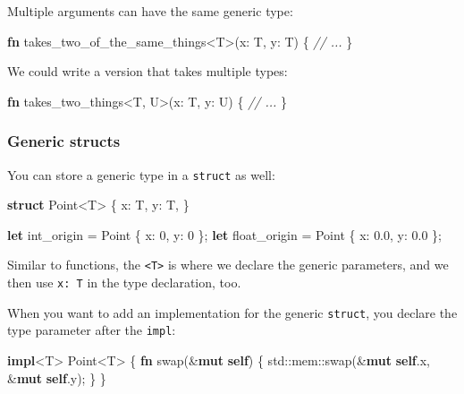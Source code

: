 \documentclass[a4paper,]{book}
\newenvironment{Shaded}{\begin{snugshade}}{\end{snugshade}}
\newcommand{\KeywordTok}[1]{\textcolor[rgb]{0.13,0.29,0.53}{\textbf{{#1}}}}
\newcommand{\DecValTok}[1]{\textcolor[rgb]{0.00,0.00,0.81}{{#1}}}
\newcommand{\CommentTok}[1]{\textcolor[rgb]{0.56,0.35,0.01}{\textit{{#1}}}}
\newcommand{\NormalTok}[1]{{#1}}
\begin{document}
Multiple arguments can have the same generic type:

\begin{Shaded}
\begin{Highlighting}[]
\KeywordTok{fn} \NormalTok{takes_two_of_the_same_things<T>(x: T, y: T) \{}
    \CommentTok{// ...}
\NormalTok{\}}
\end{Highlighting}
\end{Shaded}

We could write a version that takes multiple types:

\begin{Shaded}
\begin{Highlighting}[]
\KeywordTok{fn} \NormalTok{takes_two_things<T, U>(x: T, y: U) \{}
    \CommentTok{// ...}
\NormalTok{\}}
\end{Highlighting}
\end{Shaded}

\subsubsection{Generic structs}\label{generic-structs}

You can store a generic type in a \texttt{struct} as well:

\begin{Shaded}
\begin{Highlighting}[]
\KeywordTok{struct} \NormalTok{Point<T> \{}
    \NormalTok{x: T,}
    \NormalTok{y: T,}
\NormalTok{\}}

\KeywordTok{let} \NormalTok{int_origin = Point \{ x: }\DecValTok{0}\NormalTok{, y: }\DecValTok{0} \NormalTok{\};}
\KeywordTok{let} \NormalTok{float_origin = Point \{ x: }\DecValTok{0.0}\NormalTok{, y: }\DecValTok{0.0} \NormalTok{\};}
\end{Highlighting}
\end{Shaded}

Similar to functions, the \texttt{\textless{}T\textgreater{}} is where
we declare the generic parameters, and we then use \texttt{x:\ T} in the
type declaration, too.

When you want to add an implementation for the generic \texttt{struct},
you declare the type parameter after the \texttt{impl}:

\begin{Shaded}
\begin{Highlighting}[]
\KeywordTok{impl}\NormalTok{<T> Point<T> \{}
    \KeywordTok{fn} \NormalTok{swap(&}\KeywordTok{mut} \KeywordTok{self}\NormalTok{) \{}
        \NormalTok{std::mem::swap(&}\KeywordTok{mut} \KeywordTok{self}\NormalTok{.x, &}\KeywordTok{mut} \KeywordTok{self}\NormalTok{.y);}
    \NormalTok{\}}
\NormalTok{\}}
\end{Highlighting}
\end{Shaded}
\end{document}

